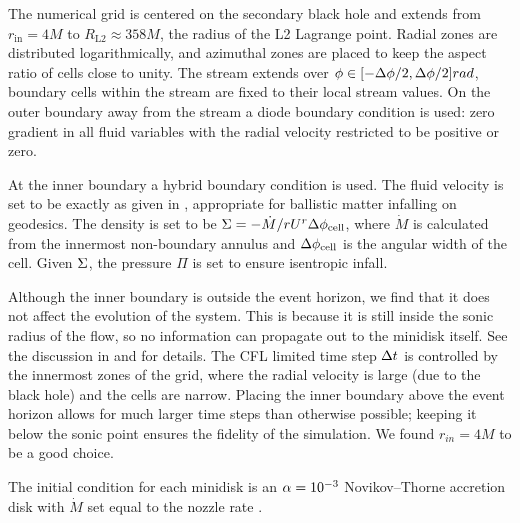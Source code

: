 The numerical grid is centered on the secondary black hole and extends from $r_\text{in} = 4 M$ to $R_\text{L2} \approx 358 M$, the radius of the L2 Lagrange point. Radial zones are distributed logarithmically, and azimuthal zones are placed to keep the aspect ratio of cells close to unity. The stream extends over $\phi \in [-\Delta \phi / 2, \Delta \phi / 2] rad$, boundary cells within the stream are fixed to their local stream values. On the outer boundary away from the stream a diode boundary condition is used: zero gradient in all fluid variables with the radial velocity restricted to be positive or zero.

At the inner boundary a hybrid boundary condition is used.  The fluid velocity is set to be exactly as given in , appropriate for ballistic matter infalling on geodesics.  The density is set to be $\Sigma = -\dot{M} / r U^r \Delta \phi_\text{cell}$, where $\dot{M}$ is calculated from the innermost non-boundary annulus and $\Delta \phi_\text{cell}$ is the angular width of the cell.  Given $\Sigma$, the pressure $\Pi$ is set to ensure isentropic infall.

Although the inner boundary is outside the event horizon, we find that it does not affect the evolution of the system.  This is because it is still inside the sonic radius of the flow, so no information can propagate out to the minidisk itself.  See the discussion in  and  for details. The CFL limited time step $\Delta t$ is controlled by the innermost zones of the grid, where the radial velocity is large (due to the black hole) and the cells are narrow.  Placing the inner boundary above the event horizon allows for much larger time steps than otherwise possible; keeping it below the sonic point ensures the fidelity of the simulation.  We found $r_{in} = 4M$ to be a good choice.

The initial condition for each minidisk is an $\alpha=10^{-3}$ Novikov--Thorne accretion disk with $\dot{M}$ set equal to the nozzle rate \citep{Novikov73}.  


